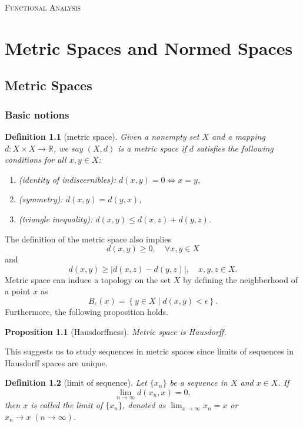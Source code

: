 \documentclass{report}
\newtheorem{definition}{Definition}[section]
\newtheorem{proposition}{Proposition}[section]
\theoremstyle{nonumberplain}
\begin{document}
\begin{center}
	\textsc{\Huge Functional Analysis}
	~\\
	\vspace{1em}  
	
\end{center}
\vspace{1em} 
\tableofcontents
\chapter{Metric Spaces and Normed Spaces}
\section{Metric Spaces}
\subsection{Basic notions}
\begin{definition}[metric space]
	Given a nonempty set $X$ and a mapping $d:X\times X\to \mathbb{R}$, we say $(X,d)$ is a \emph{metric space} if $d$ satisfies the following conditions for all $x,y\in X$:
	\begin{enumerate}
		\item (identity of indiscernibles): $d(x,y)=0\iff x=y$,
		\item (symmetry): $d(x,y)=d(y,x)$,
		\item (triangle inequality): $d(x,y)\le d(x,z)+d(y,z)$.
	\end{enumerate}	
\end{definition}

\noindent The definition of the metric space also implies
\[
	d(x,y)\ge 0,\quad\forall x,y\in X
\]
and 
\[
	d(x,y)\ge|d(x,z)-d(y,z)|,\quad x,y,z\in X.
\]
Metric space can induce a topology on the set $X$ by defining the neighberhood of a point $x$ as 
\[
	B_\epsilon(x)=\left\{y\in X\mid d(x,y)<\epsilon \right\}.
\]
Furthermore, the following proposition holds.

\begin{proposition}[Hausdorffness]
	Metric space is Hausdorff.
\end{proposition}
This suggests us to study sequences in metric spaces since limits of sequences in Hausdorff spaces are unique. 
\begin{definition}[limit of sequence]
	Let $\{x_n\}$ be a sequence in $X$ and $x\in X$. If
	\[
		\lim_{n\to\infty}d(x_n,x)=0,
	\]
	then $x$ is called the \emph{limit} of $\{x_n\}$, denoted as $\lim_{x\to\infty}x_n=x$ or $x_n\to x\;(n\to\infty)$.
\end{definition}
\end{document}
